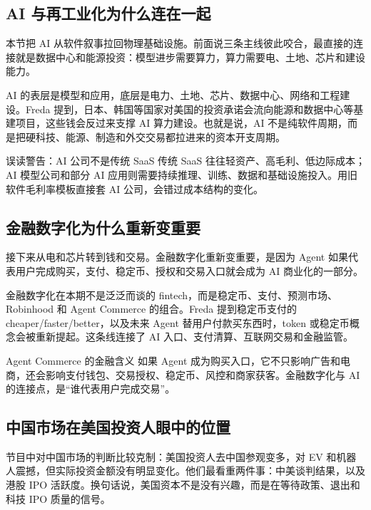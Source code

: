 \documentclass[a4paper]{article}
\begin{document}
\subsection{AI 与再工业化为什么连在一起}

本节把 AI 从软件叙事拉回物理基础设施。前面说三条主线彼此咬合，最直接的连接就是数据中心和能源投资：模型进步需要算力，算力需要电、土地、芯片和建设能力。

AI 的表层是模型和应用，底层是电力、土地、芯片、数据中心、网络和工程建设。Freda 提到，日本、韩国等国家对美国的投资承诺会流向能源和数据中心等基建项目，这些钱会反过来支撑 AI 算力建设。也就是说，AI 不是纯软件周期，而是把硬科技、能源、制造和外交交易都拉进来的资本开支周期。

\begin{warningbox}{误读警告：AI 公司不是传统 SaaS}
传统 SaaS 往往轻资产、高毛利、低边际成本；AI 模型公司和部分 AI 应用则需要持续推理、训练、数据和基础设施投入。用旧软件毛利率模板直接套 AI 公司，会错过成本结构的变化。
\end{warningbox}

\subsection{金融数字化为什么重新变重要}

接下来从电和芯片转到钱和交易。金融数字化重新变重要，是因为 Agent 如果代表用户完成购买，支付、稳定币、授权和交易入口就会成为 AI 商业化的一部分。

金融数字化在本期不是泛泛而谈的 fintech，而是稳定币、支付、预测市场、Robinhood 和 Agent Commerce 的组合。Freda 提到稳定币支付的 cheaper/faster/better，以及未来 Agent 替用户付款买东西时，token 或稳定币概念会被重新提起。这条线连接了 AI 入口、支付清算、互联网交易和金融监管。

\begin{importantbox}{Agent Commerce 的金融含义}
如果 Agent 成为购买入口，它不只影响广告和电商，还会影响支付钱包、交易授权、稳定币、风控和商家获客。金融数字化与 AI 的连接点，是“谁代表用户完成交易”。
\end{importantbox}

\subsection{中国市场在美国投资人眼中的位置}

节目中对中国市场的判断比较克制：美国投资人去中国参观变多，对 EV 和机器人震撼，但实际投资金额没有明显变化。他们最看重两件事：中美谈判结果，以及港股 IPO 活跃度。换句话说，美国资本不是没有兴趣，而是在等待政策、退出和科技 IPO 质量的信号。
\end{document}
